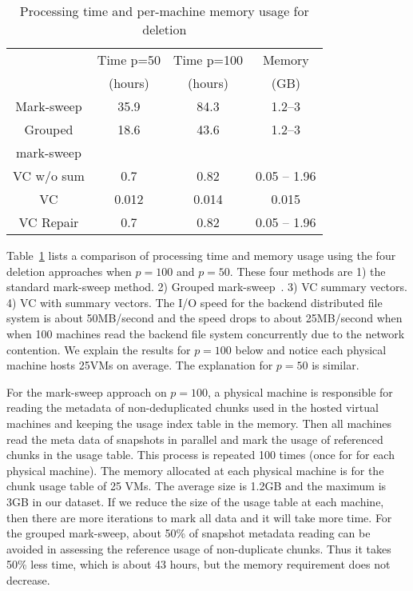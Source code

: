 

\begin{table}[htb]
\centering
\begin{tabular}{|c|c|c|c|}
    \hline 
	    &Time p=50 & Time p=100 & Memory \\
	    &(hours)  & (hours) & (GB) \\
\hline
Mark-sweep  & 35.9  &  84.3  & 1.2--3 \\
\hline
Grouped &     18.6    & 43.6   & 1.2--3 \\
mark-sweep &        &    &  \\
\hline
VC w/o sum &  0.7     & 0.82   & 0.05 -- 1.96 \\
\hline
VC  &  0.012      & 0.014   & 0.015  \\
\hline
\hline
VC Repair  &  0.7      & 0.82   & 0.05 -- 1.96 \\
\hline
    \end{tabular}
    \caption{ Processing time and per-machine memory usage  for
deletion}  
    \label{tab:deletion-cmp}
\end{table}

Table~\ref{tab:deletion-cmp}   lists a comparison of processing time and memory usage
using the four deletion approaches when $p=100$ and $p=50$. These four 
methods are 1) the standard mark-sweep method. 2) Grouped mark-sweep~\cite{Guo2011}. 
3)   VC summary vectors. 4) VC with summary vectors.
The I/O speed for the backend distributed file system is about 50MB/second
and the speed drops to about 25MB/second when
when 100 machines read the backend file system concurrently due to the network
contention. We explain the results for $p=100$ below and notice each physical machine hosts 25VMs on average. The explanation for $p=50$ is similar.

For the mark-sweep approach on $p=100$, a physical machine is responsible for
reading the metadata of non-deduplicated chunks used in the hosted 
virtual machines and keeping the usage index table in the memory.
Then all machines read the meta data 
of snapshots in parallel and mark the usage of referenced chunks
in the usage table.
This process is repeated 100 times (once for for each physical machine).
The memory allocated at each physical machine is for the 
chunk usage table of 25 VMs. The average size is 1.2GB and the maximum is
3GB in our dataset. If we reduce the size of  the usage table at each machine, 
then there are more iterations to mark all data and it 
will take more time.    
For the grouped mark-sweep, about 50\% of snapshot metadata reading can be 
avoided in assessing the reference usage of non-duplicate chunks. 
Thus it takes 50\% less time, which is about 43 hours, but the 
memory requirement does not decrease.

